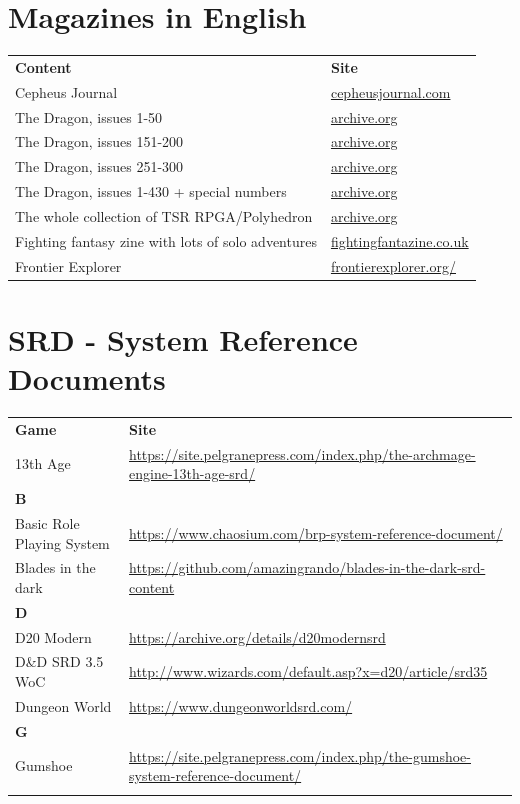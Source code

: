 \documentclass[a4paper, 11pt, twoside]{article}
\begin{document}
\section{Magazines in English}
\label{sec:org58556e2}

\begin{longtable}{ll}
\textbf{Content} & \textbf{Site}\\
Cepheus Journal & \href{https://cepheusjournal.com/}{cepheusjournal.com}\\
The Dragon, issues 1-50 & \href{https://archive.org/details/DragonMagazine045\_201903}{archive.org}\\
The Dragon, issues 151-200 & \href{https://archive.org/details/DragonMagazine200\_201903/dragon\%2520151-200/Dragon\%2520Magazine\%2520\%2523151/page/n0/mode/2up}{archive.org}\\
The Dragon, issues 251-300 & \href{https://archive.org/details/DragonMagazine200\_201903/dragon\%2520151-200/Dragon\%2520Magazine\%2520\%2523151/page/n0/mode/2up}{archive.org}\\
The Dragon, issues 1-430 + special numbers & \href{https://archive.org/details/DragonMagazine260\_201801/Dragon\%2520Magazine\%2520430/mode/2up}{archive.org}\\
The whole collection of TSR RPGA/Polyhedron & \href{https://archive.org/details/Polyhedron105}{archive.org}\\
Fighting fantasy zine with lots of solo adventures & \href{http://www.fightingfantazine.co.uk/page/}{fightingfantazine.co.uk}\\
Frontier Explorer & \href{https://frontierexplorer.org/}{frontierexplorer.org/}\\
\end{longtable}

\section{SRD - System Reference Documents}
\label{sec:orgc0019eb}

\begin{longtable}{lp{10cm}}
\textbf{Game} & \textbf{Site}\\
13th Age & \url{https://site.pelgranepress.com/index.php/the-archmage-engine-13th-age-srd/}\\
\textbf{B} & \\
Basic Role Playing System & \url{https://www.chaosium.com/brp-system-reference-document/}\\
Blades in the dark & \url{https://github.com/amazingrando/blades-in-the-dark-srd-content}\\
\textbf{D} & \\
D20 Modern & \url{https://archive.org/details/d20modernsrd}\\
D\&D SRD 3.5 WoC & \url{http://www.wizards.com/default.asp?x=d20/article/srd35}\\
Dungeon World & \url{https://www.dungeonworldsrd.com/}\\
\textbf{G} & \\
Gumshoe & \url{https://site.pelgranepress.com/index.php/the-gumshoe-system-reference-document/}\\
 & \\
\end{longtable}
\end{document}
